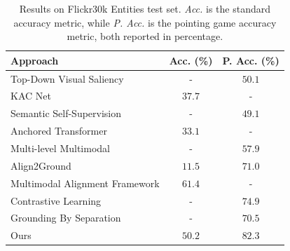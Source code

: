 \begin{table}
  \centering
  \begin{tabular}{lcc}
    \toprule
    Approach & Acc. (\%) & P. Acc. (\%) \\
    \midrule
    Top-Down Visual Saliency \cite{ramanishka2017top}        & -      & $50.1$ \\
    KAC Net \cite{chen2018knowledge}                         & $37.7$ & -      \\
    Semantic Self-Supervision \cite{javed2018learning}       & -      & $49.1$ \\
    Anchored Transformer \cite{zhao2018weakly}               & $33.1$ & -      \\
    Multi-level Multimodal \cite{akbari2019multi}            & -      & $57.9$ \\
    Align2Ground \cite{datta2019align2ground}                & $11.5$ & $71.0$ \\
    Multimodal Alignment Framework \cite{wang2020maf}        & $\bm{61.4}$ & -    \\
    Contrastive Learning \cite{gupta2020contrastive}         & -      & $74.9$ \\
    Grounding By Separation \cite{arbelle2021detector}       & -      & $70.5$ \\
    \midrule
    Ours                                                     & $50.2$ & $82.3$ \\
    \bottomrule
  \end{tabular}
  \caption[Results on Flickr30k Entities test set]{Results on
  Flickr30k Entities test set. \textit{Acc.} is the standard accuracy
  metric, while \textit{P. Acc.} is the pointing game accuracy metric,
  both reported in percentage.}
  \label{tab:results-flickr30k}
\end{table}

